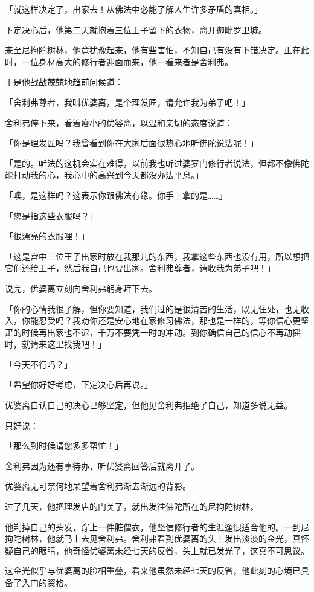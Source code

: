 \documentclass[twoside,openany]{book}
\begin{document}
「就这样决定了，出家去！从佛法中必能了解人生许多矛盾的真相。」

下定决心后，他第二天就抱着三位王子留下的衣物，离开迦毗罗卫城。

来至尼拘陀树林，他竟犹豫起来，他有些害怕，不知自己有没有下错决定。正在此时，一位身材高大的修行者迎面而来，他一看来者是舍利弗。

于是他战战兢兢地趋前问候道：

「舍利弗尊者，我叫优婆离，是个理发匠，请允许我为弟子吧！」

舍利弗停下来，看着瘦小的优婆离，以温和亲切的态度说道：

「你是理发匠吗？我曾看到你在大家后面很热心地听佛陀说法呢！」

「是的。听法的这机会实在难得，以前我也听过婆罗门修行者说法，但都不像佛陀能打动我的心，我心中的高兴到今天都没办法平息。」

「噢，是这样吗？这表示你跟佛法有缘。你手上拿的是……」

「您是指这些衣服吗？」

「很漂亮的衣服哩！」

「这是宫中三位王子出家时放在我那儿的东西，我拿这些东西也没有用，所以想把它们还给王子，然后我自己也要出家。舍利弗尊者，请收我为弟子吧！」

说完，优婆离立刻向舍利弗躬身拜下去。

「你的心情我很了解，但你要知道，我们过的是很清苦的生活，既无住处，也无收入，你能忍受吗？我劝你还是安心地在家修习佛法，那也是一样的，等你信心更坚疋的时候再出家也不迟，千万不要凭一时的冲动。到你确信自己的信心不再动摇时，就请来这里找我吧！」

「今天不行吗？」

「希望你好好考虑，下定决心后再说。」

优婆离自认自己的决心已够坚定，但他见舍利弗拒绝了自己，知道多说无益。

只好说：

「那么到时候请您多多帮忙！」

舍利弗因为还有事待办，听优婆离回答后就离开了。

优婆离无可奈何地呆望着舍利弗渐去渐远的背影。

过了几天，他把理发店的门关了，就出发往佛陀所在的尼拘陀树林。

他剃掉自己的头发，穿上一件脏僧衣，他坚信修行者的生涯逢很适合他的。一到尼拘陀树林，他就马上去见舍利弗。舍利弗看到优婆离的头上发出淡淡的金光，真怀疑自己的眼睛，他奇怪优婆离未经七天的反省，头上就已发光了，这真不可思议。

这金光似乎与优婆离的脸相重叠，看来他虽然未经七天的反省，他此刻的心境已具备了入门的资格。
\end{document}
